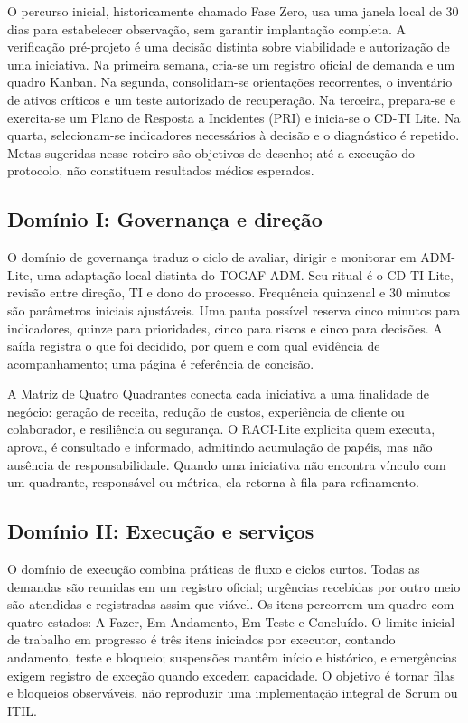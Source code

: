 O percurso inicial, historicamente chamado Fase Zero, usa uma janela local de 30 dias para estabelecer observação, sem garantir implantação completa. A verificação pré-projeto é uma decisão distinta sobre viabilidade e autorização de uma iniciativa. Na primeira semana, cria-se um registro oficial de demanda e um quadro Kanban. Na segunda, consolidam-se orientações recorrentes, o inventário de ativos críticos e um teste autorizado de recuperação. Na terceira, prepara-se e exercita-se um Plano de Resposta a Incidentes (PRI) e inicia-se o CD-TI Lite. Na quarta, selecionam-se indicadores necessários à decisão e o diagnóstico é repetido. Metas sugeridas nesse roteiro são objetivos de desenho; até a execução do protocolo, não constituem resultados médios esperados.

\subsection{Domínio I: Governança e direção}

O domínio de governança traduz o ciclo de avaliar, dirigir e monitorar em ADM-Lite, uma adaptação local distinta do TOGAF ADM. Seu ritual é o CD-TI Lite, revisão entre direção, TI e dono do processo. Frequência quinzenal e 30 minutos são parâmetros iniciais ajustáveis. Uma pauta possível reserva cinco minutos para indicadores, quinze para prioridades, cinco para riscos e cinco para decisões. A saída registra o que foi decidido, por quem e com qual evidência de acompanhamento; uma página é referência de concisão.

A Matriz de Quatro Quadrantes conecta cada iniciativa a uma finalidade de negócio: geração de receita, redução de custos, experiência de cliente ou colaborador, e resiliência ou segurança. O RACI-Lite explicita quem executa, aprova, é consultado e informado, admitindo acumulação de papéis, mas não ausência de responsabilidade. Quando uma iniciativa não encontra vínculo com um quadrante, responsável ou métrica, ela retorna à fila para refinamento.

\subsection{Domínio II: Execução e serviços}

O domínio de execução combina práticas de fluxo e ciclos curtos. Todas as demandas são reunidas em um registro oficial; urgências recebidas por outro meio são atendidas e registradas assim que viável. Os itens percorrem um quadro com quatro estados: A Fazer, Em Andamento, Em Teste e Concluído. O limite inicial de trabalho em progresso é três itens iniciados por executor, contando andamento, teste e bloqueio; suspensões mantêm início e histórico, e emergências exigem registro de exceção quando excedem capacidade. O objetivo é tornar filas e bloqueios observáveis, não reproduzir uma implementação integral de Scrum ou ITIL.

